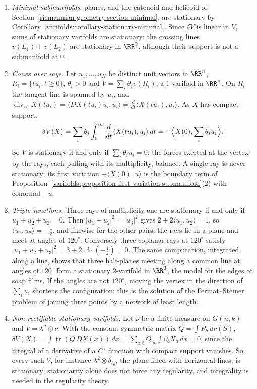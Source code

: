 \begin{example}\label{varifolds:example-stationary}
\begin{enumerate}
\item \emph{Minimal submanifolds}: planes, and the catenoid and helicoid of Section~\ref{riemannian-geometry:section-minimal}, are stationary by Corollary~\ref{varifolds:corollary-stationary-minimal}. Since $\delta V$
is linear in $V$, sums of stationary varifolds are stationary: the crossing lines $v(L_1) + v(L_2)$ are stationary in $\RR^2$, although their support is not a submanifold at $0$.
\item \emph{Cones over rays.} Let $u_1, \ldots, u_N$ be distinct unit vectors in $\RR^n$, $R_i = \{tu_i : t \geq 0\}$, $\theta_i > 0$ and $V = \sum_i\theta_iv(R_i)$, a $1$-varifold in $\RR^n$. On $R_i$ the tangent line is
spanned by $u_i$, and $\operatorname{div}_{R_i}X(tu_i) = \langle DX(tu_i)u_i, u_i\rangle = \frac{d}{dt}\langle X(tu_i), u_i\rangle$. As $X$ has compact support,
\[
\delta V(X) = \sum_i\theta_i\int_0^\infty\frac{d}{dt}\langle X(tu_i), u_i\rangle\,dt = -\Bigl\langle X(0), \sum_i\theta_iu_i\Bigr\rangle .
\]
So $V$ is stationary if and only if $\sum_i\theta_iu_i = 0$: the forces exerted at the vertex by the rays, each pulling with its multiplicity, balance. A single ray is never stationary; its first variation
$-\langle X(0), u\rangle$ is the boundary term of Proposition~\ref{varifolds:proposition-first-variation-submanifold}(2) with conormal $-u$.
\item \emph{Triple junctions.} Three rays of multiplicity one are stationary if and only if $u_1 + u_2 + u_3 = 0$. Then $|u_1 + u_2|^2 = |u_3|^2$ gives $2 + 2\langle u_1, u_2\rangle = 1$, so
$\langle u_1, u_2\rangle = -\frac12$, and likewise for the other pairs: the rays lie in a plane and meet at angles of $120^\circ$. Conversely three coplanar rays at $120^\circ$ satisfy
$|u_1 + u_2 + u_3|^2 = 3 + 2 \cdot 3 \cdot (-\frac12) = 0$. The same computation, integrated along a line, shows that three half-planes meeting along a common line at angles of $120^\circ$ form a stationary
$2$-varifold in $\RR^3$, the model for the edges of soap films. If the angles are not $120^\circ$, moving the vertex in the direction of $\sum_iu_i$ shortens the configuration: this is the solution of
the Fermat--Steiner problem of joining three points by a network of least length.
\item \emph{Non-rectifiable stationary varifolds.} Let $\nu$ be a finite measure on $G(n, k)$ and $V = \lambda^n \otimes \nu$. With the constant symmetric matrix $Q = \int P_S\,d\nu(S)$,
$\delta V(X) = \int\operatorname{tr}(Q\,DX(x))\,dx = \sum_{a,b}Q_{ab}\int\partial_bX_a\,dx = 0$, since the integral of a derivative of a $C^1$ function with compact support vanishes. So every such $V$, for instance
$\lambda^2 \otimes \delta_{\ell_0}$, the plane filled with horizontal lines, is stationary: stationarity alone does not force any regularity, and integrality is needed in the regularity theory.
\end{enumerate}
\end{example}

